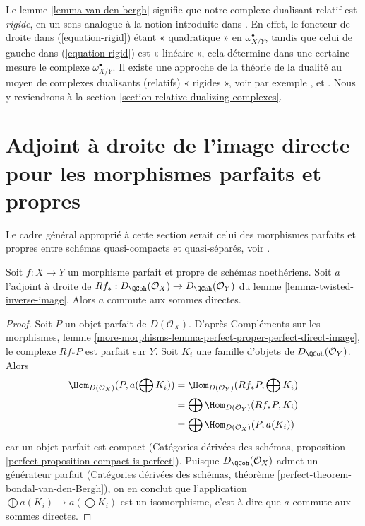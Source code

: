 \begin{remark}
\label{remark-van-den-bergh}
Le lemme \ref{lemma-van-den-bergh} signifie que notre complexe dualisant relatif est {\it rigide}, en un sens analogue à la notion introduite dans \cite{vdB-rigid}. En effet, le foncteur de droite dans (\ref{equation-rigid}) étant « quadratique » en $\omega_{X/Y}^\bullet$, tandis que celui de gauche dans (\ref{equation-rigid}) est « linéaire », cela détermine dans une certaine mesure le complexe $\omega_{X/Y}^\bullet$. Il existe une approche de la théorie de la dualité au moyen de complexes dualisants (relatifs) « rigides », voir par exemple \cite{Neeman-rigid}, \cite{Yekutieli-rigid} et \cite{Yekutieli-Zhang}. Nous y reviendrons à la section \ref{section-relative-dualizing-complexes}.
\end{remark}





\section{Adjoint à droite de l'image directe pour les morphismes parfaits et propres}
\label{section-perfect-proper}

\noindent
Le cadre général approprié à cette section serait celui des morphismes parfaits et propres entre schémas quasi-compacts et quasi-séparés, voir \cite{LN}.

\begin{lemma}
\label{lemma-proper-flat-noetherian}
Soit $f : X \to Y$ un morphisme parfait et propre de schémas noethériens. Soit $a$ l'adjoint à droite de $Rf_* : D_\QCoh(\mathcal{O}_X) \to D_\QCoh(\mathcal{O}_Y)$ du lemme \ref{lemma-twisted-inverse-image}. Alors $a$ commute aux sommes directes.
\end{lemma}

\begin{proof}
Soit $P$ un objet parfait de $D(\mathcal{O}_X)$. D'après Compléments sur les morphismes, lemme \ref{more-morphisms-lemma-perfect-proper-perfect-direct-image}, le complexe $Rf_*P$ est parfait sur $Y$. Soit $K_i$ une famille d'objets de $D_\QCoh(\mathcal{O}_Y)$. Alors
\begin{align*}
\Hom_{D(\mathcal{O}_X)}(P, a(\bigoplus K_i))
& =
\Hom_{D(\mathcal{O}_Y)}(Rf_*P, \bigoplus K_i) \\
& =
\bigoplus \Hom_{D(\mathcal{O}_Y)}(Rf_*P, K_i) \\
& =
\bigoplus \Hom_{D(\mathcal{O}_X)}(P, a(K_i))
\end{align*}
car un objet parfait est compact (Catégories dérivées des schémas, proposition \ref{perfect-proposition-compact-is-perfect}). Puisque $D_\QCoh(\mathcal{O}_X)$ admet un générateur parfait (Catégories dérivées des schémas, théorème \ref{perfect-theorem-bondal-van-den-Bergh}), on en conclut que l'application $\bigoplus a(K_i) \to a(\bigoplus K_i)$ est un isomorphisme, c'est-à-dire que $a$ commute aux sommes directes.
\end{proof}

